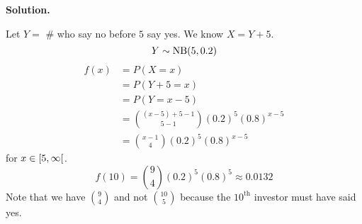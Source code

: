 \textbf{Solution.}

Let $ Y= $ \# who say no before $ 5 $ say yes. We know $ X=Y+5 $.
\[ Y\sim\operatorname{NB}(5,0.2) \]
\begin{align*}
    f(x) & =P(X=x)                                   \\
         & =P(Y+5=x)                                 \\
         & =P(Y=x-5)                                 \\
         & =\binom{(x-5)+5-1}{5-1}(0.2)^5(0.8)^{x-5} \\
         & =\binom{x-1}{4}(0.2)^5(0.8)^{x-5}
\end{align*}
for $ x\in\rinterval{5}{\infty} $.
\[ f(10)=\binom{9}{4}(0.2)^5(0.8)^5\approx 0.0132\]
Note that we have $ \binom{9}{4} $ and not $ \binom{10}{5} $ because
the $10^{\text{th}}$ investor must have said yes.

